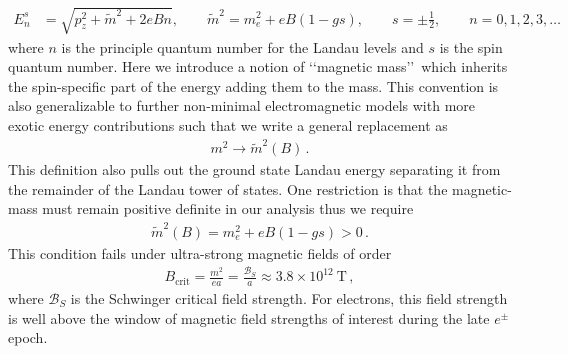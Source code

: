 \documentclass[Universe,article,submit,moreauthors,pdftex]{Definitions/mdpi}
\begin{document}
\begin{align}
  \label{KGPEnergy} E_{n}^{s}&=\sqrt{p^2_z+\tilde{m}^2+2eBn},\qquad\tilde{m}^2=m^2_e+eB\left(1-gs\right),\qquad s=\pm\frac{1}{2},\qquad n=0,1,2,3,\dots
\end{align}
where $n$ is the principle quantum number for the Landau levels and $s$ is the spin quantum number. Here we introduce a notion of \lq\lq magnetic mass\rq\rq\ which inherits the spin-specific part of the energy adding them to the mass. This convention is also generalizable to further non-minimal electromagnetic models with more exotic energy contributions such that we write a general replacement as
\begin{align}
  \label{MagMass} m^{2}\rightarrow\tilde{m}^2(B)\,.
\end{align}
This definition also pulls out the ground state Landau energy separating it from the remainder of the Landau tower of states. One restriction is that the magnetic-mass must remain positive definite in our analysis thus we require
\begin{align}
  \label{MassLimit} \tilde{m}^2(B)=m^2_e+eB\left(1-gs\right)>0\,.
\end{align}
This condition fails under ultra-strong magnetic fields of order
\begin{align}
  \label{MagMassFail} B_{\mathrm{crit}}=\frac{m^{2}}{ea}=\frac{\mathcal{B}_{S}}{a}\approx3.8\times10^{12}\ \mathrm{T}\,,
\end{align}
where $\mathcal{B}_{S}$ is the Schwinger critical field strength. For electrons, this field strength is well above the window of magnetic field strengths of interest during the late $e^{\pm}$ epoch.
\end{document}
